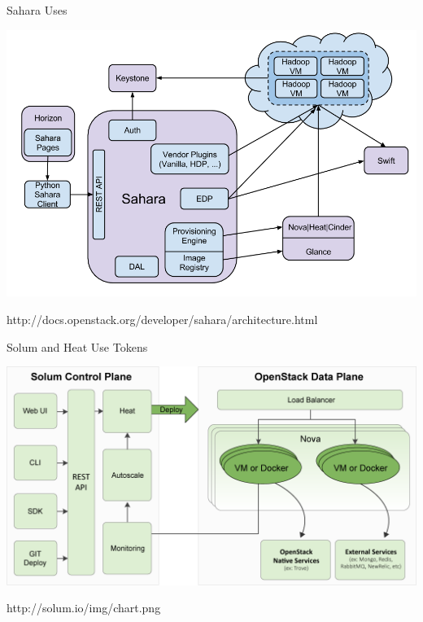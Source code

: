 \documentclass{beamer}
\begin{document}
\begin{frame}{Sahara Uses}
  \begin{block}{}
    \includegraphics[scale=0.3]{sahara-architecture.png}
  \end{block}
  http://docs.openstack.org/developer/sahara/architecture.html
\end {frame}

\begin{frame}{Solum and Heat Use Tokens}
  \begin{block}{}
    \includegraphics[scale=0.3]{solum-arch.png}
  \end{block}
  http://solum.io/img/chart.png
\end {frame}
\end{document}
